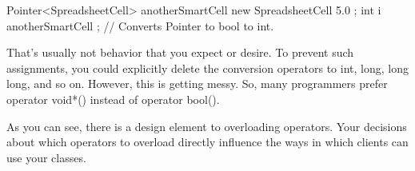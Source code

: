 \begin{cpp}
Pointer<SpreadsheetCell> anotherSmartCell { new SpreadsheetCell { 5.0 } };
int i { anotherSmartCell }; // Converts Pointer to bool to int.
\end{cpp}

That’s usually not behavior that you expect or desire. To prevent such assignments, you could explicitly delete the conversion operators to int, long, long long, and so on. However, this is getting messy. So, many programmers prefer operator void*() instead of operator bool().

As you can see, there is a design element to overloading operators. Your decisions about which operators to overload directly influence the ways in which clients can use your classes.

